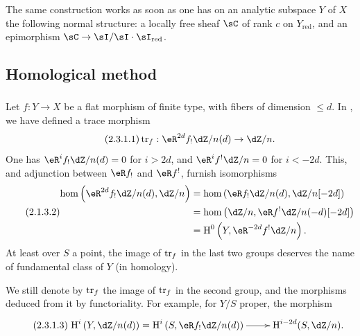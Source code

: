 The same construction works as soon as one has on an analytic subspace $Y$
of $X$ the following normal structure: a locally free sheaf $\sC$ of
rank $c$ on $Y_\text{red}$, and an epimorphism
$\sC\to \sI/\sI\cdot \sI_\text{red}$.










\subsection{Homological method}\label{IV:2-3}




\subsubsection{}\label{IV:2-3-1}

Let $f:Y\to X$ be a flat morphism of finite type, with fibers of dimension
$\leqslant d$. In \cite[XVIII 2.9]{sga4}, we have defined a trace
morphism
\begin{equation*}\tag{2.3.1.1}\label{IV:eq:2-3-1-1}
  \tr_f:\eR^{2 d} f_! \dZ/n(d) \to \dZ/n \text{.}
\end{equation*}
One has $\eR^i f_!\dZ/n(d)=0$ for $i>2 d$, and $\eR^i f^!\dZ/n=0$ for $i<-2 d$.
This, and adjunction between $\eR f_!$ and $\eR f^!$, furnish isomorphisms
\begin{equation*}\tag{2.1.3.2}\label{IV:eq:2-1-3-2}
\begin{aligned}
  \hom\left(\eR^{2 d}f_!\dZ/n(d),\dZ/n\right)
    &= \hom\left(\eR f_!\dZ/n(d),\dZ/n[-2 d]\right) \\
    &= \hom\left(\dZ/n,\eR f^!\dZ/n(-d)[-2 d]\right) \\
    &= \h^0\left(Y,\eR^{-2 d}f^!\dZ/n\right) \text{.}
\end{aligned}
\end{equation*}
At least over $S$ a point, the image of $\operatorname{tr}_f$ in the last two groups
deserves the name of fundamental class of $Y$ (in homology).

We still denote by $\operatorname{tr}_f$ the image of $\operatorname{tr}_f$ in the second group, and the
morphisms deduced from it by functoriality. For example, for $Y/S$
proper, the morphism
\begin{equation*}\tag{2.3.1.3}\label{IV:eq:2-3-1-3}
\xymatrix{
  \h^i\left(Y,\dZ/n(d)\right) = \h^i\left(S,\eR f_!\dZ/n(d)\right) \ar[r]
    & \h^{i-2 d}(S,\dZ/n) \text{.}
}
\end{equation*}

